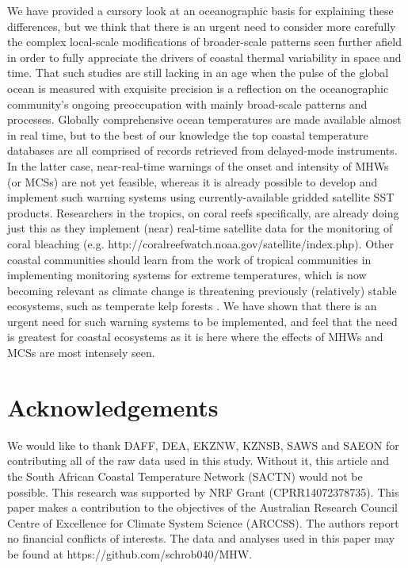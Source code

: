\documentclass[a4paper,10pt,review]{elsarticle}
\begin{document}
We have provided a cursory look at an oceanographic basis for explaining these differences, but we think that there is an urgent need to consider more carefully the complex local-scale modifications of broader-scale patterns seen further afield in order to fully appreciate the drivers of coastal thermal variability in space and time. That such studies are still lacking in an age when the pulse of the global ocean is measured with exquisite precision is a reflection on the oceanographic community's ongoing preoccupation with mainly broad-scale patterns and processes. Globally comprehensive ocean temperatures are made available almost in real time, but to the best of our knowledge the top coastal temperature databases are all comprised of records retrieved from delayed-mode instruments. In the latter case, near-real-time warnings of the onset and intensity of MHWs (or MCSs) are not yet feasible, whereas it is already possible to develop and implement such warning systems using currently-available gridded satellite SST products. Researchers in the tropics, on coral reefs specifically, are already doing just this as they implement (near) real-time satellite data for the monitoring of coral bleaching (e.g. http://coralreefwatch.noaa.gov/satellite/index.php). Other coastal communities should learn from the work of tropical communities in implementing monitoring systems for extreme temperatures, which is now becoming relevant as climate change is threatening previously (relatively) stable ecosystems, such as temperate kelp forests \citep{Wernberg2013}. We have shown that there is an urgent need for such warning systems to be implemented, and feel that the need is greatest for coastal ecosystems as it is here where the effects of MHWs and MCSs are most intensely seen. 



\section*{Acknowledgements}
We would like to thank DAFF, DEA, EKZNW, KZNSB, SAWS and SAEON for contributing all of the raw data used in this study. Without it, this article and the South African Coastal Temperature Network (SACTN) would not be possible. This research was supported by NRF Grant (CPRR14072378735). This paper makes a contribution to the objectives of the Australian Research Council Centre of Excellence for Climate System Science (ARCCSS). The authors report no financial conflicts of interests. The data and analyses used in this paper may be found at https://github.com/schrob040/MHW.
\end{document}
